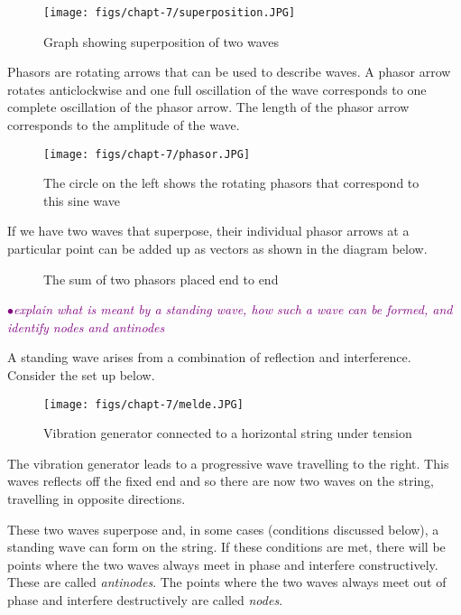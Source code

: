 \documentclass[a4paper,11pt,twoside]{memoir}
\newcounter{spec}[chapter]
\newcommand{\spec}[1]{\Needspace{5\baselineskip}\textcolor{purple}{$\bullet$\hspace{0.5cm}\textit{#1}}}
\begin{document}
\begin{figure}[h!]
\centering
\texttt{[image: figs/chapt-7/superposition.JPG]}
\caption{Graph showing superposition of two waves}
\end{figure}

Phasors are rotating arrows that can be used to describe waves. A phasor arrow rotates anticlockwise and one full oscillation of the wave corresponds to one complete oscillation of the phasor arrow. The length of the phasor arrow corresponds to the amplitude of the wave.

\begin{figure}[h]
\centering
\texttt{[image: figs/chapt-7/phasor.JPG]}
\caption{The circle on the left shows the rotating phasors that correspond to this sine wave}
\end{figure}

If we have two waves that superpose, their individual phasor arrows at a particular point can be added up as vectors as shown in the diagram below.

\begin{figure}[h]
\centering
{}
\caption{The sum of two phasors placed end to end}
\end{figure}

\spec{explain what is meant by a standing wave, how such a wave can be formed, and identify nodes and antinodes}

A standing wave arises from a combination of reflection and interference. Consider the set up below.

\begin{figure}[h!]
\centering
\texttt{[image: figs/chapt-7/melde.JPG]}
\caption{Vibration generator connected to a horizontal string under tension}
\end{figure}

The vibration generator leads to a progressive wave travelling to the right. This waves reflects off the fixed end and so there are now two waves on the string, travelling in opposite directions.

These two waves superpose and, in some cases (conditions discussed below), a standing wave can form on the string. If these conditions are met, there will be points where the two waves always meet in phase and interfere constructively. These are called \emph{antinodes}. The points where the two waves always meet out of phase and interfere destructively are called \emph{nodes}.
\end{document}
